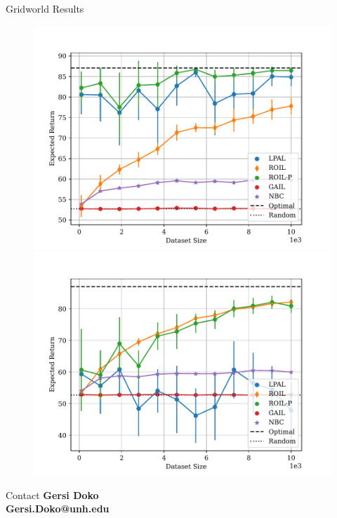 \documentclass[final,a0paper]{beamer}
\begin{document}
\begin{frame}{}
\begin{columns}[t]
  \begin{column}{0.3\linewidth}
    \begin{block}{Gridworld Results}
        \begin{center}
            \begin{figure}
                \includegraphics[scale=1.5]{../../pres_roil/plots/returns/40x40_gridworld_on_policy_returns.pdf}
                \includegraphics[scale=1.5]{../../pres_roil/plots/returns/40x40_gridworld_off_policy_returns.pdf}
            \end{figure}
        \end{center}
    \end{block}

    \begin{block}{Contact}
        \textbf{Gersi Doko}\\
        \textbf{Gersi.Doko@unh.edu}
    \end{block}
  \end{column}
\end{columns}
\end{frame}
\end{document}
